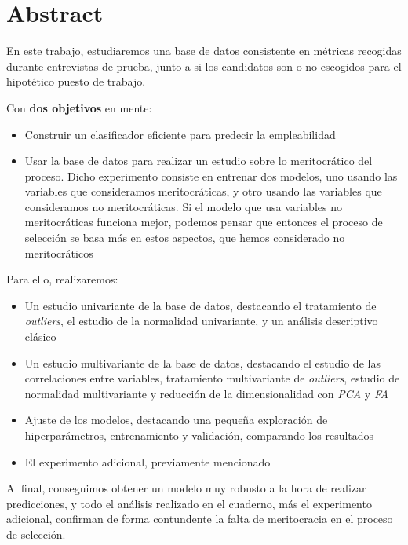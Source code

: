 \section{Abstract}


En este trabajo, estudiaremos una base de datos consistente en métricas recogidas durante entrevistas de prueba, junto a si los candidatos son o no escogidos para el hipotético puesto de trabajo.

Con \textbf{dos objetivos} en mente:

\begin{itemize}
    \item Construir un clasificador eficiente para predecir la empleabilidad
    \item Usar la base de datos para realizar un estudio sobre lo meritocrático del proceso. Dicho experimento consiste en entrenar dos modelos, uno usando las variables que consideramos meritocráticas, y otro usando las variables que consideramos no meritocráticas. Si el modelo que usa variables no meritocráticas funciona mejor, podemos pensar que entonces el proceso de selección se basa más en estos aspectos, que hemos considerado no meritocráticos
\end{itemize}

Para ello, realizaremos:

\begin{itemize}
    \item Un estudio univariante de la base de datos, destacando el tratamiento de \textit{outliers}, el estudio de la normalidad univariante, y un análisis descriptivo clásico
    \item Un estudio multivariante de la base de datos, destacando el estudio de las correlaciones entre variables, tratamiento multivariante de \textit{outliers}, estudio de normalidad multivariante y reducción de la dimensionalidad con \textit{PCA} y \textit{FA}
    \item Ajuste de los modelos, destacando una pequeña exploración de hiperparámetros, entrenamiento y validación, comparando los resultados
    \item El experimento adicional, previamente mencionado
\end{itemize}

Al final, conseguimos obtener un modelo muy robusto a la hora de realizar predicciones, y todo el análisis realizado en el cuaderno, más el experimento adicional, confirman de forma contundente la falta de meritocracia en el proceso de selección.



